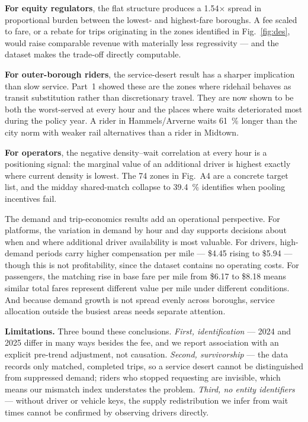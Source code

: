 \documentclass[10pt,a4paper]{article}
\begin{document}
\textbf{For equity regulators}, the flat structure produces a \num{1.54}$\times$
spread in proportional burden between the lowest- and highest-fare boroughs. A
fee scaled to fare, or a rebate for trips originating in the zones identified in
Fig.~\ref{fig:des}, would raise comparable revenue with materially less
regressivity --- and the dataset makes the trade-off directly computable.

\textbf{For outer-borough riders}, the service-desert result has a sharper
implication than slow service. Part~1 showed these are the zones where ridehail
behaves as transit substitution rather than discretionary travel. They are now
shown to be both the worst-served at every hour and the places where waits
deteriorated most during the policy year. A rider in Hammels/Arverne waits
\SI{61}{\percent} longer than the city norm with weaker rail alternatives than a
rider in Midtown.

\textbf{For operators}, the negative density--wait correlation at every hour is a
positioning signal: the marginal value of an additional driver is highest exactly
where current density is lowest. The 74 zones in Fig.~A4 are a concrete target
list, and the midday shared-match collapse to \SI{39.4}{\percent} identifies when
pooling incentives fail.

The demand and trip-economics results add an operational perspective. For
platforms, the variation in demand by hour and day supports decisions about when
and where additional driver availability is most valuable. For drivers,
high-demand periods carry higher compensation per mile --- \$4.45 rising to
\$5.94 --- though this is not profitability, since the dataset contains no
operating costs. For passengers, the matching rise in base fare per mile from
\$6.17 to \$8.18 means similar total fares represent different value per mile
under different conditions. And because demand growth is not spread evenly across
boroughs, service allocation outside the busiest areas needs separate attention.

\textbf{Limitations.} Three bound these conclusions. \emph{First, identification}
--- 2024 and 2025 differ in many ways besides the fee, and we report association
with an explicit pre-trend adjustment, not causation. \emph{Second,
survivorship} --- the data records only matched, completed trips, so a service
desert cannot be distinguished from suppressed demand; riders who stopped
requesting are invisible, which means our mismatch index understates the problem.
\emph{Third, no entity identifiers} --- without driver or vehicle keys, the
supply redistribution we infer from wait times cannot be confirmed by observing
drivers directly.
\end{document}
